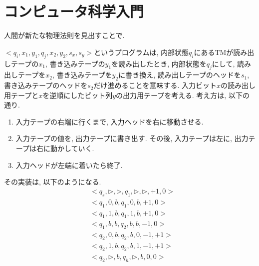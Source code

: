\chapter{コンピュータ科学入門}

\begin{ex}
    \label{ex3.1}
    人間が新たな物理法則を見出すことで.
\end{ex}


\begin{ex}
    \label{ex3.2}

\end{ex}

\begin{ex}
    \label{ex3.3}
    $<q_i, x_1, y_1, q_j, x_2, y_2, s_x, s_y>$というプログラムは, 内部状態$q_i$にあるTMが読み出しテープの$x_1$, 書き込みテープの$y_1$を読み出したとき, 内部状態を$q_j$にして, 読み出しテープを$x_2$, 書き込みテープを$y_2$に書き換え, 読み出しテープのヘッドを$s_1$, 書き込みテープのヘッドを$s_2$だけ進めることを意味する.
    入力ビット$x$の読み出し用テープと$x$を逆順にしたビット列$y$の出力用テープを考える. 考え方は, 以下の通り.
    \begin{enumerate}
        \item 入力テープの右端に行くまで, 入力ヘッドを右に移動させる.
        \item 入力テープの値を, 出力テープに書き出す. その後, 入力テープは左に, 出力テープは右に動かしていく.
        \item 入力ヘッドが左端に着いたら終了.
    \end{enumerate}
    その実装は, 以下のようになる.
    \begin{align*}
         & <q_s, \rhd, \rhd, q_1, \rhd, \rhd, +1, 0> \\
         & <q_1, 0, b, q_1, 0, b,+1, 0>              \\
         & <q_1, 1, b, q_1, 1, b, +1, 0>             \\
         & <q_1, b, b, q_2, b, b, -1, 0>             \\
         & <q_2, 0, b, q_2, b, 0, -1, +1>            \\
         & <q_2, 1, b, q_2, b, 1, -1, +1>            \\
         & <q_2, \rhd, b, q_h, \rhd, b, 0, 0>
    \end{align*}

\end{ex}

